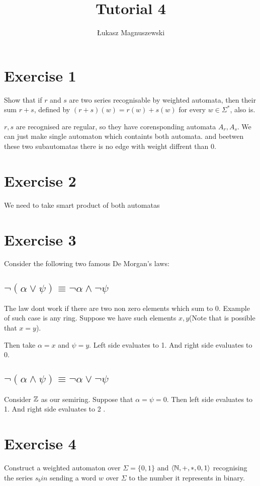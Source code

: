 \documentclass{article}
\author{Łukasz Magnuszewski}
\title{Tutorial 4}
\begin{document}
\maketitle


\section{Exercise 1}
Show that if $r$ and $s$ are two series recognisable by weighted automata, then their sum $r +s$, defined by $(r+s)(w) = r(w) + s(w)$ for every $w \in \Sigma^*$, also is.

$r,s$ are recognised are regular, so they have corensponding automata $A_r, A_s$. We can just make single automaton which containts both automata. and beetwen these two subautomatas there is no edge with weight diffrent than 0.


\section{Exercise 2}
We need to take smart product of both automatas


\section{Exercise 3}
Consider the following two famous De Morgan's laws:
\subsection{$\neg(\alpha \lor \psi) \equiv \neg \alpha \land \neg \psi$}

The law dont work if there are two non zero elements which sum to 0. Example of such case is any ring.
Suppose we have such elements $x,y$(Note that is possible that $x=y$).

Then take $\alpha = x$ and $\psi = y$. Left side evaluates to 1. And right side evaluates to 0\coffee.


\subsection{$\neg(\alpha \land \psi) \equiv \neg \alpha \lor \neg \psi$}
Consider $\mathbb{Z}$ as our semiring.
Suppose that $\alpha = \psi = 0 $. Then left side evaluates to 1. And right side evaluates to 2 \coffee.   

\section{Exercise 4}
Construct a weighted automaton over $\Sigma = \{0,1\}$ and $\langle \mathbb{N}, +, *, 0, 1 \rangle$ recognising the series $s_bin$ sending a word $w$ over $\Sigma$ to the number it represents in binary.
\end{document}
